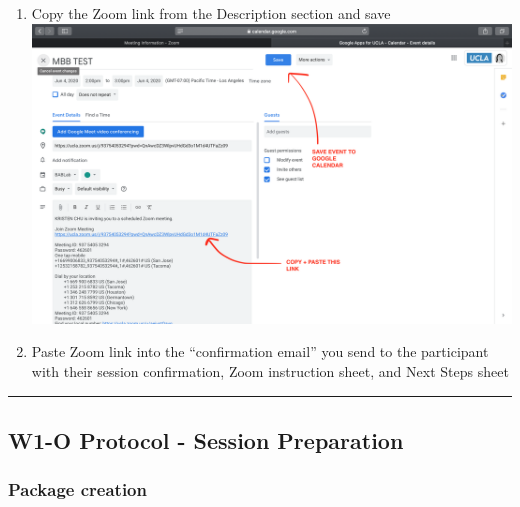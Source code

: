 \documentclass[]{book}
\begin{document}
\begin{enumerate}
\item
  Copy the Zoom link from the Description section and save \includegraphics{images/zoom_link/7.png}
\item
  Paste Zoom link into the ``confirmation email'' you send to the participant with their session confirmation, Zoom instruction sheet, and Next Steps sheet
\end{enumerate}

\begin{center}\rule{0.5\linewidth}{0.5pt}\end{center}

\hypertarget{w1-o-protocol---session-preparation}{%
\subsection{W1-O Protocol - Session Preparation}\label{w1-o-protocol---session-preparation}}

\hypertarget{package-creation}{%
\subsubsection{Package creation}\label{package-creation}}
\end{document}
